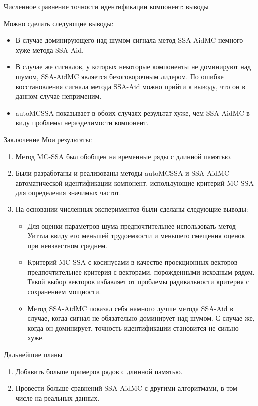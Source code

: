 \documentclass[pdf,notheorems,10pt,intlimits,unicode]{beamer}
\begin{document}
\begin{frame}{Численное сравнение точности идентификации компонент: выводы}

    Можно сделать следующие выводы:
    \begin{itemize}
        \item В случае доминирующего над шумом сигнала метод SSA-AidMC немного хуже метода SSA-Aid.\medskip
        \item В случае же сигналов, у которых некоторые компоненты не доминируют над шумом, SSA-AidMC является безоговорочным лидером. По ошибке восстановления сигнала метода SSA-Aid можно прийти к выводу, что он в данном случае неприменим.\medskip
        \item autoMCSSA показывает в обоих случаях результат хуже, чем SSA-AidMC в виду проблемы неразделимости компонент.
    \end{itemize}
    
\end{frame}

\begin{frame}{Заключение}
    \small
    Мои результаты:
    \begin{enumerate}
        \item Метод MC-SSA был обобщен на временные ряды с длинной памятью.
        \item Были разработаны и реализованы методы autoMCSSA и SSA-AidMC автоматической идентификации компонент, использующие критерий MC-SSA для определения значимых частот.
        \item На основании численных экспериментов были сделаны следующие выводы:
        \begin{itemize}\small
            \item Для оценки параметров шума предпочтительнее использовать метод Уиттла ввиду его меньшей трудоемкости и меньшего смещения оценок при неизвестном среднем.
            \item Критерий MC-SSA с косинусами в качестве проекционных векторов предпочтительнее критерия с векторами, порожденными исходным рядом. Такой выбор векторов избавляет от проблемы радикальности критерия с сохранением мощности.
            \item Метод SSA-AidMC показал себя намного лучше метода SSA-Aid в случае, когда сигнал не обязательно доминирует над шумом. С случае же, когда он доминирует, точность идентификации становится не сильно хуже.
        \end{itemize}
    \end{enumerate}
    
\end{frame}

\begin{frame}{Дальнейшие планы}
    
    \begin{enumerate}
        \item Добавить больше примеров рядов с длинной памятью.\medskip
        \item Провести больше сравнений SSA-AidMC с другими алгоритмами, в том числе на реальных данных.
    \end{enumerate}
    
\end{frame}
\end{document}
